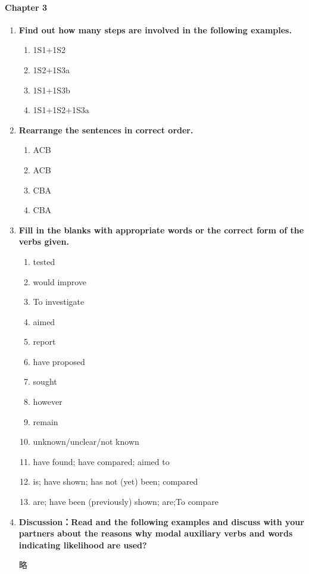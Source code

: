 \documentclass[a4paper]{ctexbook}
\begin{document}
\paragraph*{Chapter 3}\par
\begin{enumerate}
  \item \textbf{Find out how many steps are involved in the following examples.}
  \begin{enumerate}
    \item 1S1+1S2
    \item 1S2+1S3a
    \item 1S1+1S3b
    \item 1S1+1S2+1S3a
  \end{enumerate}

  \item \textbf{Rearrange the sentences in correct order.}
  \begin{enumerate}
    \item ACB
    \item ACB
    \item CBA
    \item CBA
  \end{enumerate}

  \item \textbf{Fill in the blanks with appropriate words or the correct form of the verbs given.}
  \begin{enumerate}
    \item tested
    \item would improve
    \item To investigate
    \item aimed
    \item report
    \item have proposed
    \item sought
    \item however
    \item remain
    \item unknown/unclear/not known
    \item have found; have compared; aimed to
    \item is; have shown; has not (yet) been; compared
    \item are; have been (previously) shown; are;To compare
  \end{enumerate}

  \item \textbf{Discussion：Read and the following examples and discuss with your partners about the reasons why modal auxiliary verbs and words indicating likelihood are used?}
  
  略
\end{enumerate}
\end{document}
